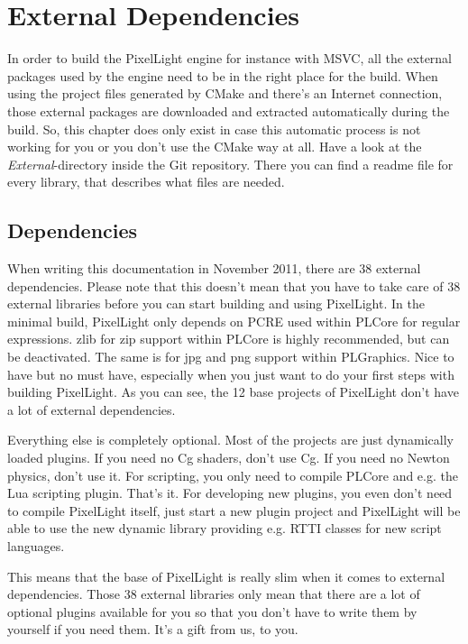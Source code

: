 \chapter{External Dependencies}
\label{Chapter:ExternalDependencies}
In order to build the PixelLight engine for instance with \ac{MSVC}, all the external packages used by the engine need to be in the right place for the build. When using the project files generated by CMake and there's an Internet connection, those external packages are downloaded and extracted automatically during the build. So, this chapter does only exist in case this automatic process is not working for you or you don't use the CMake way at all. Have a look at the \emph{External}-directory inside the Git repository. There you can find a readme file for every library, that describes what files are needed.




\section{Dependencies}
When writing this documentation in November 2011, there are 38 external dependencies. Please note that this doesn't mean that you have to take care of 38 external libraries before you can start building and using PixelLight. In the minimal build, PixelLight only depends on PCRE used within PLCore for regular expressions. zlib for zip support within PLCore is highly recommended, but can be deactivated. The same is for jpg and png support within PLGraphics. Nice to have but no must have, especially when you just want to do your first steps with building PixelLight. As you can see, the 12 base projects of PixelLight don't have a lot of external dependencies.

Everything else is completely optional. Most of the projects are just dynamically loaded plugins. If you need no Cg shaders, don't use Cg. If you need no Newton physics, don't use it. For scripting, you only need to compile PLCore and e.g. the Lua scripting plugin. That's it. For developing new plugins, you even don't need to compile PixelLight itself, just start a new plugin project and PixelLight will be able to use the new dynamic library providing e.g. \ac{RTTI} classes for new script languages.

This means that the base of PixelLight is really slim when it comes to external dependencies. Those 38 external libraries only mean that there are a lot of optional plugins available for you so that you don't have to write them by yourself if you need them. It's a gift from us, to you.





